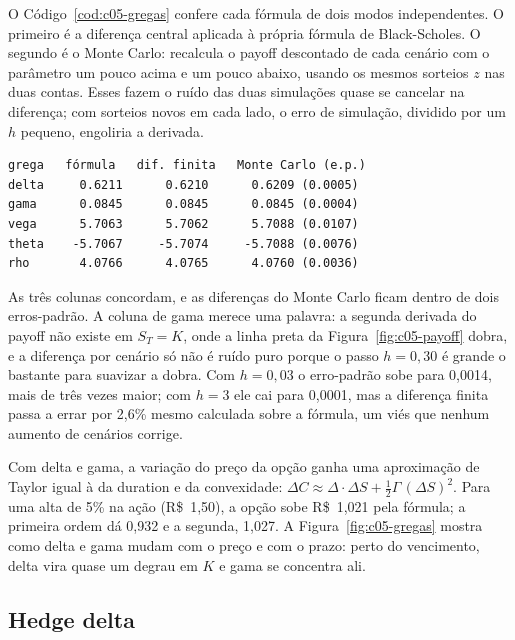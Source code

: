 O Código~\ref{cod:c05-gregas} confere cada fórmula de dois modos independentes. O primeiro é a diferença central aplicada à própria fórmula de Black-Scholes. O segundo é o Monte Carlo: recalcula o payoff descontado de cada cenário com o parâmetro um pouco acima e um pouco abaixo, usando os mesmos sorteios $z$ nas duas contas. Esses  fazem o ruído das duas simulações quase se cancelar na diferença; com sorteios novos em cada lado, o erro de simulação, dividido por um $h$ pequeno, engoliria a derivada.


\begin{lstlisting}[style=saida]
grega   fórmula   dif. finita   Monte Carlo (e.p.)
delta     0.6211      0.6210      0.6209 (0.0005)
gama      0.0845      0.0845      0.0845 (0.0004)
vega      5.7063      5.7062      5.7088 (0.0107)
theta    -5.7067     -5.7074     -5.7088 (0.0076)
rho       4.0766      4.0765      4.0760 (0.0036)
\end{lstlisting}

As três colunas concordam, e as diferenças do Monte Carlo ficam dentro de dois erros-padrão. A coluna de gama merece uma palavra: a segunda derivada do payoff não existe em $S_T = K$, onde a linha preta da Figura~\ref{fig:c05-payoff} dobra, e a diferença por cenário só não é ruído puro porque o passo $h = 0,30$ é grande o bastante para suavizar a dobra. Com $h = 0,03$ o erro-padrão sobe para 0,0014, mais de três vezes maior; com $h = 3$ ele cai para 0,0001, mas a diferença finita passa a errar por 2,6\% mesmo calculada sobre a fórmula, um viés que nenhum aumento de cenários corrige.

Com delta e gama, a variação do preço da opção ganha uma aproximação de Taylor igual à da duration e da convexidade: $\Delta C \approx \Delta\cdot\Delta S + \tfrac12\Gamma\,(\Delta S)^2$. Para uma alta de 5\% na ação (R\$~1,50), a opção sobe R\$~1,021 pela fórmula; a primeira ordem dá 0,932 e a segunda, 1,027. A Figura~\ref{fig:c05-gregas} mostra como delta e gama mudam com o preço e com o prazo: perto do vencimento, delta vira quase um degrau em $K$ e gama se concentra ali.


\subsection{Hedge delta}
\label{sec:c05-hedge}

